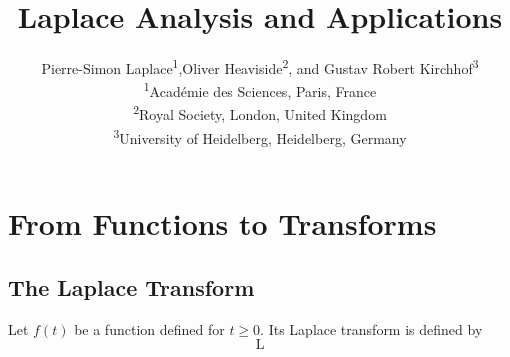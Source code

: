\documentclass{article}
\title{\textbf{Laplace Analysis and Applications}}
\author{Pierre-Simon Laplace\textsuperscript{1},Oliver Heaviside\textsuperscript{2}, and Gustav Robert Kirchhof\textsuperscript{3}\\
        {
            \textsuperscript{1}Acad\'emie des Sciences, Paris, France \\
            \textsuperscript{2}Royal Society, London, United Kingdom\\
            \textsuperscript{3}University of Heidelberg, Heidelberg, Germany
        }}
\date{}
\begin{document}
\maketitle

\section{From Functions to Transforms}
\subsection{The Laplace Transform}

Let $f(t)$ be a function defined for $t \geq 0$. Its Laplace transform is defined by \\

\[
    \mathrm{L}
\]
\end{document}
